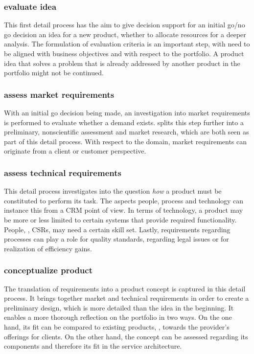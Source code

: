 	\subsubsection{evaluate idea}
	This first detail process has the aim to give decision support for an initial go/no go decision \wrt an idea for a new product, \ie whether to allocate resources for a deeper analysis. The formulation of evaluation criteria is an important step, with need to be aligned with business objectives and with respect to the portfolio. A product idea that solves a problem that is already addressed by another product in the portfolio might not be continued.  
	\subsubsection{assess  market requirements}
	With an initial go decision being made, an investigation into market requirements is performed to evaluate whether a demand exists. \citep{Edgett_1996} splits this step further into a preliminary, nonscientific assessment and market research, which are both seen as part of this detail process. With respect to the domain, market requirements can originate from a client or customer perspective. 
	\subsubsection{assess technical requirements}
	This detail process investigates into the question \textit{how} a product must be constituted to perform its task. The aspects people, process and technology can instance this from a \acrshort{CRM} point of view. In terms of technology, a product may be more or less limited to certain systems that provide required functionality. People, \ie, \acrshort{CSR}s, may need a certain skill set. Lastly, requirements regarding processes can play a role for quality standards, regarding legal issues or for realization of efficiency gains.

	\subsubsection{conceptualize product}
	The translation of requirements into a product concept is captured in this detail process. It brings together market  and technical requirements in order to create a preliminary design, which is more detailed than the idea in the beginning. It enables a more thorough reflection on the portfolio in two ways. On the one hand, its fit can be compared to existing products, \ie, towards the provider's offerings for clients. On the other hand, the concept can be assessed regarding its components and therefore its fit in the service architecture. 
	
